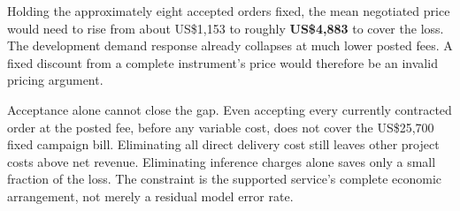 Holding the approximately eight accepted orders fixed, the mean negotiated price would need to rise from about US\$1,153 to roughly \textbf{US\$4,883} to cover the loss. The development demand response already collapses at much lower posted fees. A fixed discount from a complete instrument's price would therefore be an invalid pricing argument.

Acceptance alone cannot close the gap. Even accepting every currently contracted order at the posted fee, before any variable cost, does not cover the US\$25,700 fixed campaign bill. Eliminating all direct delivery cost still leaves other project costs above net revenue. Eliminating inference charges alone saves only a small fraction of the loss. The constraint is the supported service's complete economic arrangement, not merely a residual model error rate.
